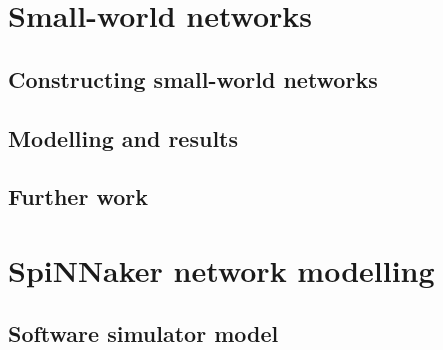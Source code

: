 	
	\section{Small-world networks}
		
		
		\subsection{Constructing small-world networks}
			
		
		\subsection{Modelling and results}
			
		
		\subsection{Further work}
			
	
	
	\section{SpiNNaker network modelling}
		
		
		\subsection{Software simulator model}
			
